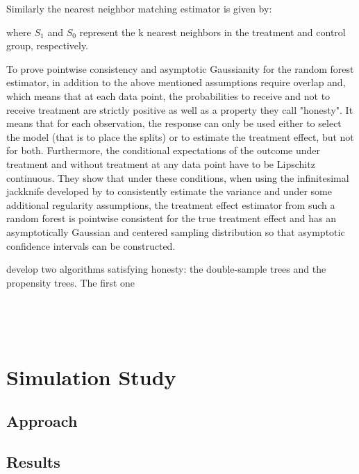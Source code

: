 \documentclass[11pt, a4paper, leqno]{article}
\begin{document}
Similarly the nearest neighbor matching estimator is given by: 

where \(S_1\) and \(S_0\) represent the k nearest neighbors in the treatment and control group, respectively.   

To prove pointwise consistency and asymptotic Gaussianity for the random forest estimator, in addition to the above mentioned assumptions \cite{wa18} require overlap and, which means that at each data point, the probabilities to receive and not to receive treatment are strictly positive as well as a property they call "honesty". It means that for each observation, the response can only be used either to select the model (that is to place the splits) or to estimate the treatment effect, but not for both. Furthermore, the conditional expectations of the outcome under treatment and without treatment at any data point have to be Lipschitz continuous.
They show that under these conditions, when using the infinitesimal jackknife developed by \cite{e14} to consistently estimate the variance and under some additional regularity assumptions, the treatment effect estimator from such a random forest is pointwise consistent for the true treatment effect and has an asymptotically Gaussian and centered sampling distribution so that asymptotic confidence intervals can be constructed. 

\cite{wa18} develop two algorithms satisfying honesty: the double-sample trees and the propensity trees. The first one 



\(\) \(\) 






 \(\) \(\) \(\) \(\) \(\) {}


\section{Simulation Study} %
\label{sec:simulation}

\subsection{Approach} %
\label{sec:sim_approach}



\subsection{Results} %
\label{sec:sim_results}
    
\end{document}
